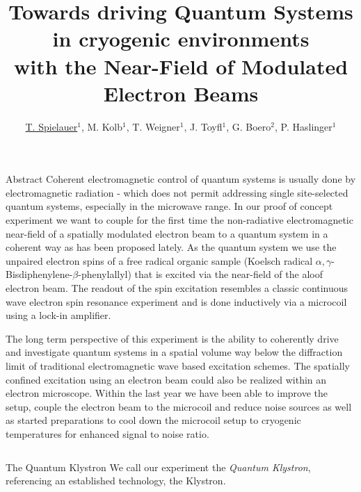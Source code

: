 \documentclass[final]{beamer}
\title{Towards driving Quantum Systems in cryogenic environments\hspace*{1cm} \\ with the Near-Field of Modulated Electron Beams}
\author{\underline{T. Spielauer$^{1}$}, M. Kolb$^{1}$, T. Weigner$^{1}$, J. Toyfl$^{1}$, G. Boero$^{2}$, P. Haslinger$^{1}$ }
\institute[]{
  {\small
  $^{1}$VCQ, Technische Universität Wien, Atominstitut, Stadionallee 2, 1020 Vienna, Austria; $^{2}$EPFL, BM 3110 Station 17, CH-1015 Lausanne, Switzerland
  }
}
\begin{document}
\begin{frame}[fragile]{}
  \begin{block}{\large Abstract}
    Coherent electromagnetic control of quantum systems is usually done by
    electromagnetic radiation - which does not permit addressing single site-selected
    quantum systems, especially in the microwave range. In our proof of concept
    experiment we want to couple for the first time the non-radiative electromagnetic
    near-field of a spatially modulated electron beam to a quantum system in
    a coherent way as has been proposed lately.  As the quantum system we
    use the unpaired electron spins of a free radical organic sample (Koelsch radical
    \- $\alpha,\gamma$-Bisdiphenylene-$\beta$-phenylallyl) that is excited via the
    near-field of the aloof electron beam. The readout of the spin excitation
    resembles a classic continuous wave electron spin resonance experiment and is
    done inductively via a microcoil using a lock-in amplifier.

    The long term perspective of this experiment is the ability to coherently drive
    and investigate quantum systems in a spatial volume way below the diffraction
    limit of traditional electromagnetic wave based excitation schemes. The spatially
    confined excitation using an electron beam could also be realized within
    an electron microscope. Within the last year we have been able to improve
    the setup, couple the electron beam to the microcoil and reduce noise sources
    as well as started preparations to cool down the microcoil setup to cryogenic
    temperatures for enhanced signal to noise ratio.
  \end{block}
  \begin{columns}[T]
    \begin{column}{.49\linewidth}
      \begin{block}{\large The Quantum Klystron}
        We call our experiment the \textit{Quantum Klystron}, referencing an established
        technology, the Klystron.


\end{block}
\end{column}
\end{columns}
\end{frame}
\end{document}

